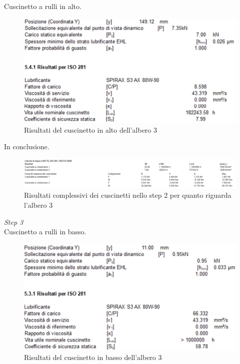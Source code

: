 Cuscinetto a rulli in alto.
\begin{figure}[h]
    \centering
    \includegraphics[scale=0.6]{Immagini/RisultatiCuscinettoAlto2Albero3.png}
    \caption{Risultati del cuscinetto in alto dell'albero 3}
    \label{fig:RisultatiCuscinettoAlto2Albero3}
\end{figure}

In conclusione.
\begin{figure}[h]
    \centering
    \includegraphics[scale=0.55]{Immagini/RisultatiCuscinetti2Albero3.png}
    \caption{Risultati complessivi dei cuscinetti nello step 2 per quanto riguarda l'albero 3}
    \label{fig:RisultatiCuscinetti2Albero3}
\end{figure}
\newpage
\emph{Step 3}\\
Cuscinetto a rulli in basso.
\begin{figure}[h]
    \centering
    \includegraphics[scale=0.6]{Immagini/RisultatiCuscinettoBasso3Albero3.png}
    \caption{Risultati del cuscinetto in basso dell'albero 3}
    \label{fig:RisultatiCuscinettoBassoAlbero3}
\end{figure}


